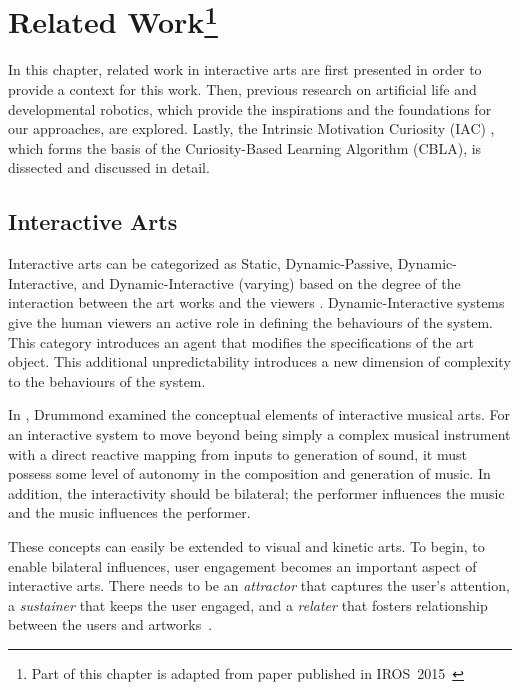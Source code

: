 \chapter[Related Work]{Related Work\footnote{Part of this chapter is adapted from paper published in IROS~2015~\cite{Chan2015}}} 
 \label{chap:related_work}

In this chapter, related work in interactive arts are first presented in order to provide a context for this work. Then, previous research on artificial life and developmental robotics, which provide the inspirations and the foundations for our approaches, are explored. Lastly, the Intrinsic Motivation Curiosity (IAC) \cite{Oudeyer2007}, which forms the basis of the Curiosity-Based Learning Algorithm (CBLA), is dissected and discussed in detail.

\section{Interactive Arts}
Interactive arts can be categorized as Static, Dynamic-Passive, Dynamic-Interactive, and Dynamic-Interactive (varying) based on the degree of the interaction between the art works and the viewers \cite{Edmonds2004}. Dynamic-Interactive systems give the human viewers an active role in defining the behaviours of the system. This category introduces an agent that modifies the specifications of the art object. This additional unpredictability introduces a new dimension of complexity to the behaviours of the system. 

In \cite{Drummond2009}, Drummond examined the conceptual elements of interactive musical arts. For an interactive system to move beyond being simply a complex musical instrument with a direct reactive mapping from inputs to generation of sound, it must possess some level of autonomy in the composition and generation of music. In addition, the interactivity should be bilateral; the performer influences the music and the music influences the performer. 

These concepts can easily be extended to visual and kinetic arts. To begin, to enable bilateral influences, user engagement becomes an important aspect of interactive arts. There needs to be an \textit{attractor} that captures the user's attention, a \textit{sustainer} that keeps the user engaged, and a \textit{relater} that fosters relationship between the users and artworks~\cite{Edmonds2006}. 

